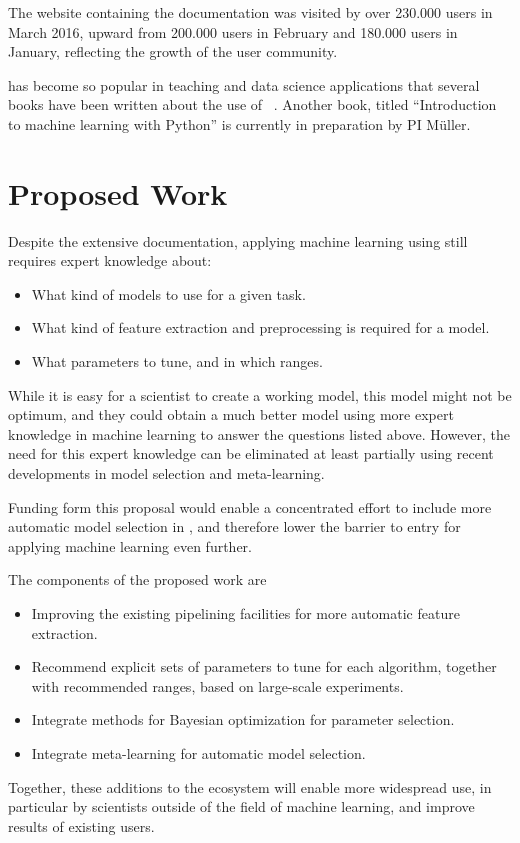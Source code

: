 The \sklearn{} website containing the documentation was visited by over
230.000 users in March 2016, upward from 200.000 users in February and 180.000 users in January,
reflecting the growth of the \sklearn{} user community.

\sklearn{} has become so popular in teaching and data science applications that
several books have been written about the use of
\sklearn{}~\autocite{garreta2013learning, hackeling2014mastering,
hauck2014scikit, raschka2015python}. Another book, titled ``Introduction to
machine learning with Python'' is currently in preparation by PI M\"uller.

\section{Proposed Work}
Despite the extensive documentation, applying machine learning using \sklearn{}
still requires expert knowledge about:
\begin{itemize}
    \item What kind of models to use for a given task.
    \item What kind of feature extraction and preprocessing is required for a model.
    \item What parameters to tune, and in which ranges.
\end{itemize}

While it is easy for a scientist to create a working model, this model might not
be optimum, and they could obtain a much better model using more expert knowledge
in machine learning to answer the questions listed above.
However, the need for this expert knowledge can be eliminated at least partially
using recent developments in model selection and meta-learning.

Funding form this proposal would enable a concentrated effort to include more
automatic model selection in \sklearn{}, and therefore lower the barrier to
entry for applying machine learning even further.

The components of the proposed work are
\begin{itemize}
    \item Improving the existing pipelining facilities for more automatic feature extraction.
    \item Recommend explicit sets of parameters to tune for each algorithm,
        together with recommended ranges, based on large-scale experiments.
    \item Integrate methods for Bayesian optimization for parameter selection.
    \item Integrate meta-learning for automatic model selection.
\end{itemize}
Together, these additions to the \sklearn{} ecosystem will enable more widespread use,
in particular by scientists outside of the field of machine learning, and improve results
of existing users.


